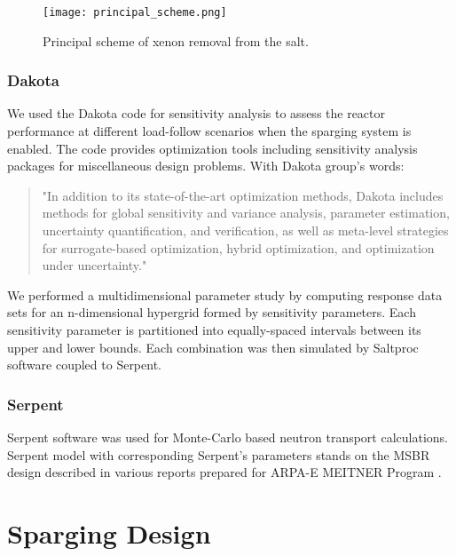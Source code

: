     \begin{figure}[h]
        \begin{center}
            \texttt{[image: principal\_scheme.png]}
        \end{center}
        \caption{Principal scheme of xenon removal from the salt.}
        \label{fig:scheme}
    \end{figure}

\subsubsection{Dakota}

    We used the Dakota code \cite{adams_dakota_2019} for sensitivity analysis to assess the reactor performance at different load-follow scenarios when the sparging system is enabled. The code provides optimization tools including sensitivity analysis packages for miscellaneous design problems. With Dakota group's words:

    \begin{quote}
        "In addition to its state-of-the-art optimization methods, Dakota
        includes methods for global sensitivity and variance analysis, parameter
        estimation, uncertainty quantification, and verification, as well as
        meta-level strategies for surrogate-based optimization, hybrid
        optimization, and optimization under uncertainty."
    \end{quote}

    We performed a multidimensional parameter study by computing response data sets for an n-dimensional hypergrid formed by sensitivity parameters. Each sensitivity parameter is partitioned into equally-spaced intervals between its upper and lower bounds. Each combination was then simulated by Saltproc software coupled to Serpent.

\subsubsection{Serpent}

    Serpent software \cite{Lep2014} was used for Monte-Carlo based neutron transport calculations. Serpent model with corresponding Serpent's parameters stands on the MSBR design described in various reports prepared for ARPA-E MEITNER Program \cite{rykhlevskii_fuel_2019, rykhlevskii_modeling_2019, rykhlevskii_fuel_2020}.

\newpage
\FloatBarrier

\section{Sparging Design}


